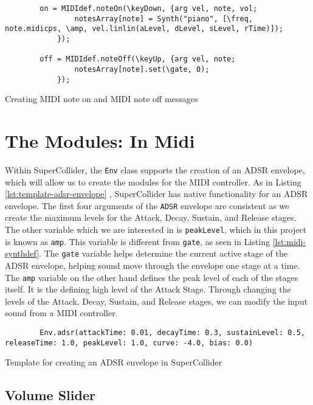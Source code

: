 \begin{listing}
	\begin{lstlisting}
		on = MIDIdef.noteOn(\keyDown, {arg vel, note, vol;
				notesArray[note] = Synth("piano", [\freq, note.midicps, \amp, vel.linlin(aLevel, dLevel, sLevel, rTime)]);
			});

		off = MIDIdef.noteOff(\keyUp, {arg vel, note;
				notesArray[note].set(\gate, 0);
			});
	\end{lstlisting}
	\caption{Creating MIDI note on and MIDI note off messages}
	\label{lst:midi-note-on-and-off}	
\end{listing}


\section{The Modules: In Midi}\label{section:the-modules-midi}

Within SuperCollider, the \texttt{Env} class supports the creation of an ADSR envelope, which will allow us to create the modules for the MIDI controller. As in Listing \ref{lst:template-adsr-envelope}  \cite{McCartney_2021}, SuperCollider has native functionality for an ADSR envelope. The first four arguments of the \texttt{ADSR} envelope are consistent as we create the maximum levels for the Attack, Decay, Sustain, and Release stages. The other variable which we are interested in is \texttt{peakLevel}, which in this project is known as \texttt{amp}. This variable is different from \texttt{gate}, as seen in Listing \ref{lst:midi-synthdef}. The \texttt{gate} variable helps determine the current active stage of the ADSR envelope, helping sound move through the envelope one stage at a time. The \texttt{amp} variable on the other hand defines the peak level of each of the stages itself. It is the defining high level of the Attack Stage. Through changing the levels of the Attack, Decay, Sustain, and Release stages, we can modify the input sound from a MIDI controller. 

\begin{listing}
	\begin{lstlisting}
		Env.adsr(attackTime: 0.01, decayTime: 0.3, sustainLevel: 0.5, releaseTime: 1.0, peakLevel: 1.0, curve: -4.0, bias: 0.0)
	\end{lstlisting}	
	\caption{Template for creating an ADSR envelope in SuperCollider}
	\label{lst:template-adsr-envelope}
\end{listing}


\subsection{Volume Slider}

